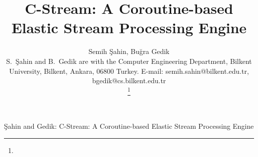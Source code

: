 



  \title{C-Stream: A Coroutine-based Elastic Stream Processing Engine}

  \author
  {
    Semih \c{S}ahin,
    Bu\u{g}ra Gedik
    \IEEEcompsocitemizethanks
    {

      \IEEEcompsocthanksitem S.\ \c{S}ahin and B.\ Gedik
            are with the
            Computer Engineering Department, Bilkent
            University, Bilkent, Ankara, 06800 Turkey. E-mail:
            semih.sahin@bilkent.edu.tr, bgedik@cs.bilkent.edu.tr
    }%
    \thanks{}
  }

           {\c{Sahin} and Gedik: C-Stream: A Coroutine-based Elastic Stream Processing Engine}
  \IEEEcompsoctitleabstractindextext{}
  \maketitle

  \IEEEpeerreviewmaketitle

  
  
  

  
  


